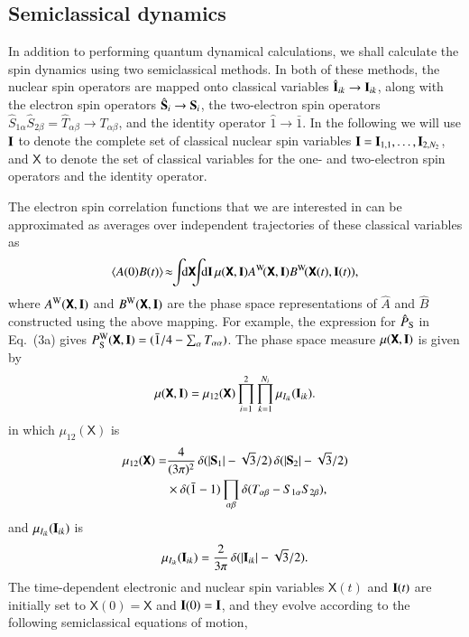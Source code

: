 \documentclass[%
aip,
jcp,%
amsmath,amssymb,
reprint%
]{revtex4-1}
\newcommand{\sing}{\ensuremath{\mathrm{S}}}
\newcommand{\wig}{\ensuremath{\mathrm{W}}}
\renewcommand{\op}[1]{\ensuremath{\hat{#1}}}
\newcommand{\sbX}{\ensuremath{\boldsymbol{\mathsf{X}}}}
\begin{document}
\subsection{Semiclassical dynamics}

In addition to performing quantum dynamical calculations, we shall calculate the spin dynamics using two semiclassical methods.\cite{Schulten1978, Lewis2014} In both of these methods, the nuclear spin operators are mapped onto classical variables $\op{\vb{I}}_{ik}\to\vb{I}_{ik}$, along with the electron spin operators $\op{\vb{S}}_i \to \vb{S}_i$, the two-electron spin operators $\op{S}_{1\alpha}\op{S}_{2\beta}=\op{T}_{\alpha\beta} \to T_{\alpha\beta}$, and the identity operator $\op{1}\to\bar{1}$. In the following we will use $\vb{I}$ to denote the complete set of classical nuclear spin variables $\vb{I} = \vb{I}_{1,1},\ldots,\vb{I}_{2,N_2}$, and $\sbX$ to denote the set of classical variables for the one- and two-electron spin operators and the identity operator. 

The electron spin correlation functions that we are interested in can be approximated as averages over independent trajectories of these classical variables as
\begin{align}
  \ev{A(0)B(t)}\!\approx\!\!\int\!\!\!\dd{\sbX}\!\!\!\int\!\!\!\dd{\vb{I}} \mu(\sbX,\vb{I}) A^\wig\!(\sbX,\vb{I}) B^\wig\!(\sbX(t),\vb{I}(t)),
\end{align}
where $A^\wig(\sbX,\vb{I})$ and $B^\wig(\sbX,\vb{I})$ are the phase space representations of $\op{A}$ and $\op{B}$ constructed using the above mapping. For example, the expression for $\hat{P}_{\rm S}$ in Eq.~(3a) gives $P_\sing^\wig(\sbX,\vb{I}) = (\bar{1}/4-\sum_{\alpha}T_{\alpha\alpha})$. The phase space measure $\mu(\sbX,\vb{I})$ is given by
\begin{align}
  \mu(\sbX,\vb{I}) = \mu_{12}(\sbX) \prod_{i=1}^2\prod_{k=1}^{N_i}\mu_{I_{ik}}(\vb{I}_{ik}).
\end{align}
in which $\mu_{12}(\sbX)$ is 
\begin{align}
\begin{split}
\mu_{12}(\sbX) =  &\frac{4}{(3\pi)^2 }\,{\delta(|\vb{S}_1|-\sqrt{3}/2)}\,{\delta(|\vb{S}_2|-\sqrt{3}/2)} \\
&\times \delta({\bar{1}-1})\prod_{\alpha\beta}\delta(T_{\alpha\beta} - S_{1\alpha}S_{2\beta}),
\end{split}
\end{align}
and $\mu_{I_{ik}}(\vb{I}_{ik})$ is
\begin{align}
\mu_{I_{ik}}(\vb{I}_{ik}) = \frac{2}{3\pi} \,{\delta(|\vb{I}_{ik}|-\sqrt{3}/2)}.
\end{align}
The time-dependent electronic and nuclear spin variables $\sbX(t)$ and $\vb{I}(t)$ are initially set to $\sbX(0)=\sbX$ and $\vb{I}(0) = \vb{I}$, and they evolve according to the following semiclassical equations of motion,\cite{Lewis2014}
\end{document}
